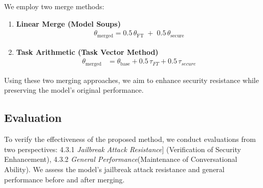 \documentclass[conference,compsoc]{IEEEtran}
\begin{document}
We employ two merge methods:
\begin{enumerate}
    \item \textbf{Linear Merge (Model Soups)~\cite{wortsman2022model}}
    \begin{align}
        \theta_{\text{merged}} 
        = 0.5 \,\theta_{\text{FT}} \;+\; 0.5\, \theta_{\text{secure}}
    \end{align}
    \item \textbf{Task Arithmetic (Task Vector Method)~\cite{Ilharco2022EditingMW}}
    \begin{align}
        \theta_{\text{merged}} 
        &= \theta_{\text{base}} 
        + 0.5 \, \tau_{FT}
        + 0.5 \, \tau_{secure}
    \end{align}
\end{enumerate}

Using these two merging approaches, we aim to enhance security resistance while preserving the model’s original performance.

\subsection{Evaluation}
\label{sec:evaluation}
To verify the effectiveness of the proposed method, we conduct evaluations from two perspectives:
4.3.1 \emph{Jailbreak Attack Resistance}] (Verification of Security Enhancement), 4.3.2 \emph{General Performance}(Maintenance of Conversational Ability). We assess the model’s jailbreak attack resistance and general performance before and after merging.


\end{document}
